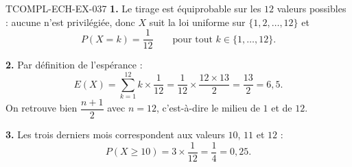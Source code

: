 \begin{corrige}{TCOMPL-ECH-EX-037}
\textbf{1.} Le tirage est équiprobable sur les $12$ valeurs possibles : aucune n'est privilégiée, donc $X$ suit la loi uniforme sur $\{1,2,\ldots,12\}$ et
\[
  P(X=k) = \frac{1}{12} \qquad \text{pour tout } k \in \{1,\ldots,12\}.
\]

\textbf{2.} Par définition de l'espérance :
\[
  E(X) = \sum_{k=1}^{12} k \times \frac{1}{12} = \frac{1}{12}\times\frac{12\times13}{2} = \frac{13}{2} = 6{,}5 .
\]
On retrouve bien $\dfrac{n+1}{2}$ avec $n=12$, c'est-à-dire le milieu de $1$ et de $12$.

\textbf{3.} Les trois derniers mois correspondent aux valeurs $10$, $11$ et $12$ :
\[
  P(X \geq 10) = 3 \times \frac{1}{12} = \frac{1}{4} = 0{,}25 .
\]
\end{corrige}
